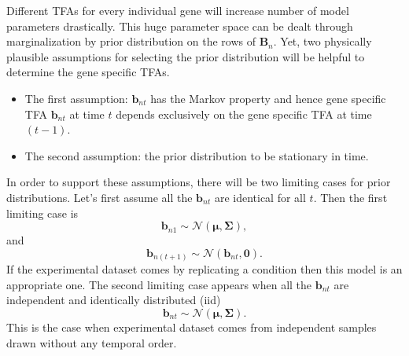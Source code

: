 Different TFAs for every individual gene will increase number of model parameters drastically. This huge parameter space can be dealt through marginalization by prior distribution on the rows of $\textbf{B}_n$. Yet, 
two physically plausible assumptions for selecting the prior distribution will be helpful to determine the gene specific TFAs. 
\begin{itemize}
	\item The first assumption: $\textbf{b}_{nt}$ has the Markov property and hence gene specific TFA $\textbf{b}_{nt} $ at time $t$ depends exclusively on the gene specific TFA at time $(t-1)$.
	\item The second assumption: the prior distribution to be stationary in time.
\end{itemize}

In order to support these assumptions, there will be two limiting cases for prior distributions. Let's first assume all the $\textbf{b}_{nt}$ are identical for all $t$. Then the first limiting case is
\begin{equation} \label{eq:limit_one_a}
\textbf{b}_{n1} \sim \mathcal{N} ( \boldsymbol{\mu},\boldsymbol{\Sigma}), 
\end{equation}
and
\begin{equation} \label{eq:limit_one_b}
\textbf{b}_{n(t+1)} \sim \mathcal{N} ( \textbf{b}_{nt},\textbf{0}).
\end{equation}
If the experimental dataset comes by replicating a condition then this model is an appropriate one. The second limiting case appears when all the $\textbf{b}_{nt}$ are independent and identically distributed (iid)
\begin{equation} \label{eq:limit_two}
\textbf{b}_{nt}\sim \mathcal{N} ( \boldsymbol{\mu},\boldsymbol{\Sigma}).
\end{equation}
This is the case when experimental dataset comes from independent samples drawn without any temporal order.

